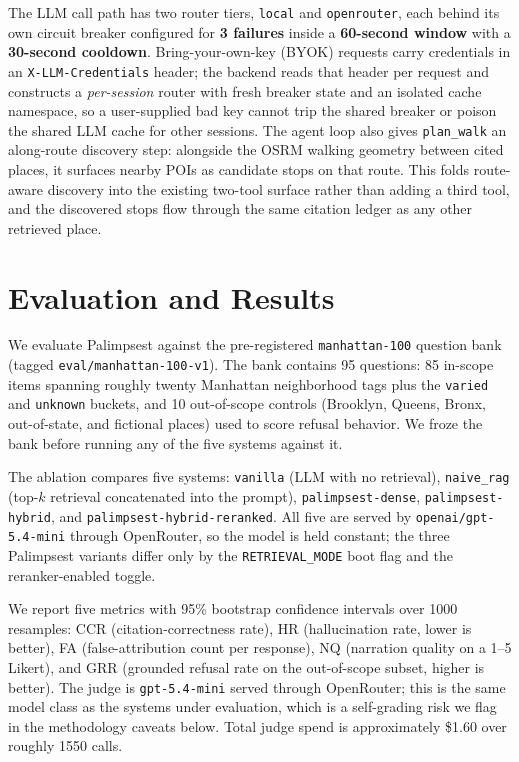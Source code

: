 \documentclass[sigconf,nonacm]{acmart}
\begin{document}
The LLM call path has two router tiers, \texttt{local} and \texttt{openrouter}, each behind its own circuit breaker configured for \textbf{3 failures} inside a \textbf{60-second window} with a \textbf{30-second cooldown}. Bring-your-own-key (BYOK) requests carry credentials in an \texttt{X-LLM-Credentials} header; the backend reads that header per request and constructs a \emph{per-session} router with fresh breaker state and an isolated cache namespace, so a user-supplied bad key cannot trip the shared breaker or poison the shared LLM cache for other sessions. The agent loop also gives \texttt{plan\_walk} an along-route discovery step: alongside the OSRM walking geometry between cited places, it surfaces nearby POIs as candidate stops on that route. This folds route-aware discovery into the existing two-tool surface rather than adding a third tool, and the discovered stops flow through the same citation ledger as any other retrieved place.

\section{Evaluation and Results}\label{sec:evaluation}
We evaluate Palimpsest against the pre-registered \texttt{manhattan-100} question bank (tagged \texttt{eval/manhattan-100-v1}). The bank contains 95 questions: 85 in-scope items spanning roughly twenty Manhattan neighborhood tags plus the \texttt{varied} and \texttt{unknown} buckets, and 10 out-of-scope controls (Brooklyn, Queens, Bronx, out-of-state, and fictional places) used to score refusal behavior. We froze the bank before running any of the five systems against it.

The ablation compares five systems: \texttt{vanilla} (LLM with no retrieval), \texttt{naive\_rag} (top-$k$ retrieval concatenated into the prompt), \texttt{palimpsest-dense}, \texttt{palimpsest-hybrid}, and \texttt{palimpsest-hybrid-\allowbreak reranked}. All five are served by \texttt{openai/\allowbreak gpt-5.4-mini} through OpenRouter, so the model is held constant; the three Palimpsest variants differ only by the \texttt{RETRIEVAL\_MODE} boot flag and the reranker-enabled toggle.

We report five metrics with 95\% bootstrap confidence intervals over 1000 resamples: CCR (citation-correctness rate), HR (hallucination rate, lower is better), FA (false-attribution count per response), NQ (narration quality on a 1--5 Likert), and GRR (grounded refusal rate on the out-of-scope subset, higher is better). The judge is \texttt{gpt-5.4-mini} served through OpenRouter; this is the same model class as the systems under evaluation, which is a self-grading risk we flag in the methodology caveats below. Total judge spend is approximately \$1.60 over roughly 1550 calls.
\end{document}

